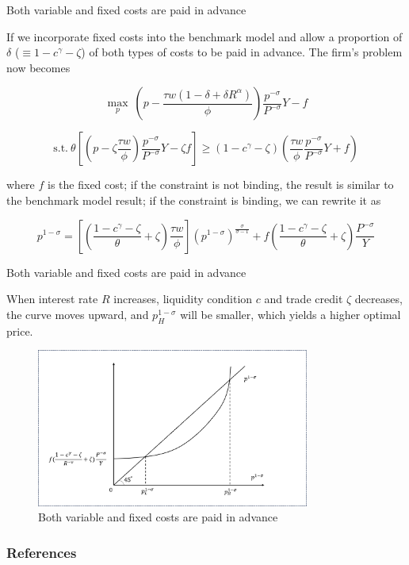\documentclass[10pt]{beamer}
\begin{document}
\begin{frame}{Both variable and fixed costs are paid in advance}

If we incorporate fixed costs into the benchmark model and allow a proportion of $\delta$ ($\equiv 1-c^{\gamma}-\zeta$) of both types of costs to be paid in advance. The firm's problem now becomes

$$
\max_{p} \ (p- \frac{\tau w(1-\delta+\delta R^\alpha)}{\phi}) \frac{p^{-\sigma}}{P^{-\sigma}} Y-f
$$

$$
\text{s.t.} \ \theta [(p -\zeta \frac{\tau w}{\phi}) \frac{p^{-\sigma}}{P^{-\sigma}} Y -\zeta f ]\geq(1-c^\gamma-\zeta) (\frac{\tau w}{\phi} \frac{p^{-\sigma}}{P^{-\sigma}} Y+f)
$$

where $f$ is the fixed cost; if the constraint is not binding, the result is similar to the benchmark model result; if the constraint is binding, we can rewrite it as 

\begin{equation}\label{eq:constraint_fixedcost}
p^{1-\sigma}=[(\frac{1-c^{\gamma}-\zeta}{\theta}+\zeta)\frac{\tau w}{\phi}] (p^{1-\sigma})^{\frac{\sigma}{\sigma-1}}+f(\frac{1-c^{\gamma}-\zeta}{\theta}+\zeta)\frac{P^{-\sigma}}{Y}
\end{equation}

\end{frame}


\begin{frame}{Both variable and fixed costs are paid in advance}

When interest rate $R$ increases, liquidity condition $c$ and trade credit $\zeta$ decreases, the curve moves upward, and $p_H^{1-\sigma}$ will be smaller, which yields a higher optimal price.

\begin{figure}[H]
     \centering
         \includegraphics[width=0.8\textwidth]{latex/drafts/pic/fixed_cost.png}
         \caption{\small Both variable and fixed costs are paid in advance}
         \label{fig: fixed_cost}
\end{figure}

\end{frame}

\begin{frame}[allowframebreaks]
\frametitle{References}
    \footnotesize
    
\end{frame}
\end{document}

